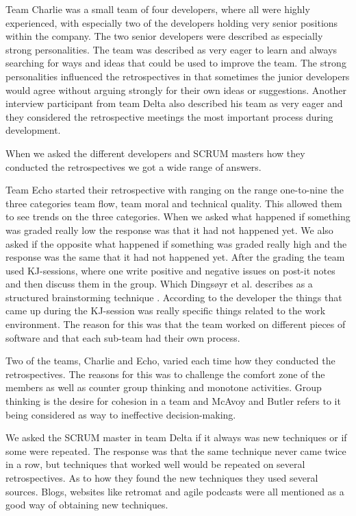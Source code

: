 Team Charlie was a small team of four developers, where all were highly experienced, with especially two of the developers holding very senior positions within the company. The two senior developers were described as especially strong personalities. The team was described as very eager to learn and always searching for ways and ideas that could be used to improve the team. The strong personalities influenced the retrospectives in that sometimes the junior developers would agree without arguing strongly for their own ideas or suggestions. Another interview participant from team Delta also described his team as very eager and they considered the retrospective meetings the most important process during development. 

\label{question-3}
When we asked the different developers and SCRUM masters how they conducted the retrospectives we got a wide range of answers. 

Team Echo started their retrospective with ranging on the range one-to-nine the three categories team flow, team moral and technical quality. This allowed them to see trends on the three categories. When we asked what happened if something was graded really low the response was that it had not happened yet. We also asked if the opposite what happened if something was graded really high and the response was the same that it had not happened yet. After the grading the team used KJ-sessions, where one write positive and negative issues on post-it notes and then discuss them in the group. Which Dingsøyr et al. describes as a structured brainstorming technique \cite{Dingsoyr2003}. According to the developer the things that came up during the KJ-session was really specific things related to the work environment. The reason for this was that the team worked on different pieces of software and that each sub-team had their own process. 

Two of the teams, Charlie and Echo, varied each time how they conducted the retrospectives. The reasons for this was to challenge the comfort zone of the members as well as counter group thinking and monotone activities. Group thinking is the desire for cohesion in a team and McAvoy and Butler \cite{Mcavoy2007} refers to it being considered as way to ineffective decision-making. 

We asked the SCRUM master in team Delta if it always was new techniques or if some were repeated. The response was that the same technique never came twice in a row, but techniques that worked well would be repeated on several retrospectives. As to how they found the new techniques they used several sources. Blogs, websites like retromat \cite{retromat2015} and agile podcasts were all mentioned as a good way of obtaining new techniques. 

